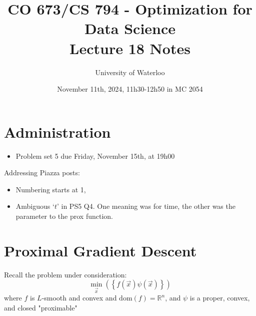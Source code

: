 \documentclass{article}
\title{CO 673/CS 794 - Optimization for Data Science\\Lecture 18 Notes}
\author{University of Waterloo}
\date{November 11th, 2024, 11h30-12h50 in MC 2054}
\newcommand{\R}{\mathbb{R}}             %
\newcommand{\x}{\vec{x}}                %
\newcommand{\dom}{\text{dom}}           %
\newcommand{\rl}[1]{\left(#1\right)}
\begin{document}
\maketitle

\section{Administration}

\begin{itemize}
    \item Problem set 5 due Friday, November 15th, at 19h00
\end{itemize}

Addressing Piazza posts:
\begin{itemize}
    \item Numbering starts at 1,
    \item Ambiguous `$t$' in PS5 Q4. One meaning was for time, the other was the parameter to the prox function.
\end{itemize}

\section{Proximal Gradient Descent}

Recall the problem under consideration:
\[
    \min_{\x}\rl{\left\{f(\x) \psi(\x)\right\}}
\]
where $f$ is $L$-smooth and convex and $\dom(f) = \R^n$, and $\psi$ is a proper, convex, and closed "proximable"
\end{document}
